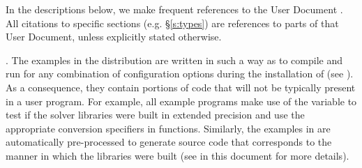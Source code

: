In the descriptions below, we make frequent references to the {\ida}
User Document \cite{ida2.4.0_ug}.  All citations to specific sections
(e.g. \S\ref{s:types}) are references to parts of that User Document, unless
explicitly stated otherwise.

\vspace{0.2in}. 
The examples in the {\ida} distribution are written in such a way as
to compile and run for any combination of configuration options during
the installation of {\sundials} (see ). As a consequence,
they contain portions of code that will not be typically present in a
user program. For example, all example programs make use of the
variable  to test if the solver libraries
were built in extended precision and use the appropriate conversion 
specifiers in  functions.  Similarly, the {\F} examples in
{\fida} are automatically pre-processed to generate source code that
corresponds to the manner in which the {\ida} libraries were built
(see  in this document for more details).
